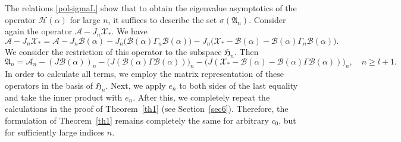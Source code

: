 \documentclass[11pt,centertags,reqno,twoside]{amsart}
\numberwithin{equation}{section}
\theoremstyle{definition}
\theoremstyle{remark}
\begin{document}
The relations \eqref{polsigmaL} show that to obtain the eigenvalue asymptotics
of the operator $\mathcal{H}(\alpha)$ for large $n$, it suffices to describe the set
$\sigma(\mathfrak{A}_n)$. Consider again the operator $\mathcal{A}-J_n\mathcal{X}_*$.
We have
\[
\mathcal{A}-J_n\mathcal{X}_*=\mathcal{A}-J_n\mathcal{B}(\alpha)
-J_n\big(\mathcal{B}(\alpha)\Gamma_n\mathcal{B}(\alpha)\big)
-J_n\big(\mathcal{X}_*-\mathcal{B}(\alpha)-\mathcal{B}(\alpha)\Gamma_n\mathcal{B}(\alpha)\big).
\]
We consider the restriction of this operator to the subspace $\mathfrak{H}_n$. Then
\[
\mathfrak{A}_n=\mathcal{A}_n-(J\mathcal{B}(\alpha))_n-\big(J(\mathcal{B}(\alpha)\Gamma
\mathcal{B}(\alpha))\big)_n-\big(J(\mathcal{X}_*-\mathcal{B}(\alpha)
-\mathcal{B}(\alpha)\Gamma\mathcal{B}(\alpha))\big)_n, \quad n\geqslant l+1.
\]
In order to calculate all terms, we employ the matrix representation of these
operators in the basis of $\mathfrak{H}_n$. Next, we apply $e_n$ to both sides of
the last equality and take the inner product with $e_n$. After this, we completely
repeat the calculations in the proof of Theorem~\ref{th1} (see Section~\ref{sec6}). Therefore, the formulation of
Theorem~\ref{th1} remains completely the same for arbitrary $c_0$, but for
sufficiently large indices $n$.
\end{document}
